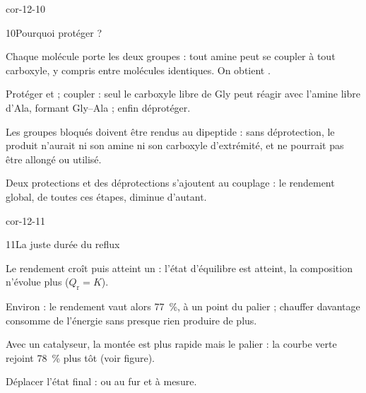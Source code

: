 \begin{blocLivre}{cor-12-10}
\begin{corrige}{10}{Pourquoi protéger ?}
\begin{questions}
\item Chaque molécule porte les deux groupes : tout amine peut se coupler à tout carboxyle, y compris entre molécules
identiques. On obtient .
\item Protéger  et  ; coupler : seul le carboxyle libre de
Gly peut réagir avec l'amine libre d'Ala, formant Gly--Ala ; enfin déprotéger.
\item Les groupes bloqués doivent être rendus au dipeptide : sans déprotection, le produit n'aurait ni son amine ni
son carboxyle d'extrémité, et ne pourrait pas être allongé ou utilisé.
\item Deux protections et des déprotections s'ajoutent au couplage : le rendement global,  de toutes ces étapes, diminue d'autant.
\end{questions}
\end{corrige}
\end{blocLivre}
\begin{blocLivre}{cor-12-11}
\begin{corrige}{11}{La juste durée du reflux}
\begin{questions}
\item Le rendement croît puis atteint un  : l'état d'équilibre est atteint, la composition
n'évolue plus ($Q_\mathrm{r}=K$).
\item Environ  : le rendement vaut alors 77~\%, à un point du palier ; chauffer davantage consomme
de l'énergie sans presque rien produire de plus.
\item Avec un catalyseur, la montée est plus rapide mais le palier  : la courbe verte
rejoint 78~\% plus tôt (voir figure).
\item Déplacer l'état final :  ou  au fur et à mesure.
\end{questions}
\end{corrige}
\end{blocLivre}
